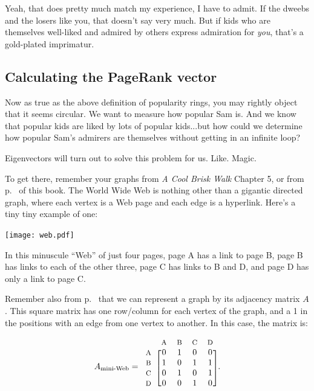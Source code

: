 \begin{alttitles}

Yeah, that does pretty much match my experience, I have to admit. If the dweebs
and the losers like you, that doesn't say very much. But if kids who are
themselves well-liked and admired by others express admiration for
\textit{you}, that's a gold-plated imprimatur.

\subsection{Calculating the PageRank vector}

Now as true as the above definition of popularity rings, you may rightly object
that it seems circular. We want to measure how popular Sam is. And we know that
popular kids are liked by lots of popular kids...but how could we determine how
popular Sam's admirers are themselves without getting in an infinite loop?

Eigenvectors will turn out to solve this problem for us. Like. Magic.


To get there, remember your graphs from \textit{A Cool Brisk Walk} Chapter 5,
or from p.~\pageref{sec:graphs} of this book. The World Wide Web is nothing
other than a gigantic directed graph, where each vertex is a Web page and each
edge is a hyperlink. Here's a tiny tiny example of one:

\begin{center}
\texttt{[image: web.pdf]}
\end{center}

In this minuscule ``Web'' of just four pages, page A has a link to page B, page
B has links to each of the other three, page C has links to B and D, and page D
has only a link to page C.

Remember also from p.~\pageref{firstAdjacencyMatrix} that we can represent a
graph by its adjacency matrix $A$. This square matrix has one row/column for
each vertex of the graph, and a 1 in the positions with an edge from one vertex
to another. In this case, the matrix is:

\[
A_{\textrm{mini-Web}} = 
\begin{blockarray}{ccccc}
& {\footnotesize\textrm{A}} & {\footnotesize\textrm{B}} & {\footnotesize\textrm{C}} & {\footnotesize\textrm{D}} \\
\begin{block}{c[cccc]}
{\footnotesize\textrm{A}} & 0 & 1 & 0 & 0 \\
{\footnotesize\textrm{B}} & 1 & 0 & 1 & 1 \\
{\footnotesize\textrm{C}} & 0 & 1 & 0 & 1 \\
{\footnotesize\textrm{D}} & 0 & 0 & 1 & 0 \\
\end{block}
\end{blockarray}.
\]


\end{alttitles}
